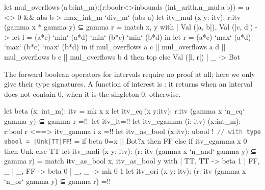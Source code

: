 \documentclass{llncs}
\begin{document}
%
\begin{fstarcode}
let mul_overflows (a b:int_m):(r:bool{r<>inbounds (int_arith.n_mul a b)})
  = a <> 0 && abs b > max_int_m `div_m` (abs a)
let itv_mul (x y: itv): r:itv {(gamma x * gamma y) ⊆ gamma r}
  = match x, y with
    | Val (|a, b|), Val (|c, d|) ->
        let l = (a*c) `min` (a*d) `min` (b*c) `min` (b*d) in
        let r = (a*c) `max` (a*d) `max` (b*c) `max` (b*d) in
        if mul_overflows a c || mul_overflows a d
        || mul_overflows b c || mul_overflows b d 
        then top else Val (|l, r|)
    | _ -> Bot
\end{fstarcode}
%
The forward boolean operators for intervals require no proof at
all; here we only give their type signatures.
%
A function of interest is : it returns
 when an interval does not contain 0,  when
it is the singleton 0,  otherwise.
%
\begin{fstarcode}
let beta (x: int_m): itv = mk x x
let itv_eq (x y:itv): r:itv {(gamma  x `n_eq` gamma  y)  ⊆  gamma  r} =!\shortdots!  let itv_lt=!\shortdots!
let itv_cgamma (i: itv) (x:int_m): r:bool {r <==> itv_gamma i x} =!\shortdots!
let itv_as_bool (x:itv): ubool !\textcolor{gray}{\texttt{ /{}/ with \textbf{type ubool = |Unk|TT|FF}}}!
  = if beta 0=x || Bot?x then FF else if itv_cgamma x 0 then Unk else TT
let itv_andi (x y: itv): (r: itv {(gamma x `n_and` gamma y) ⊆ gamma r})
  = match itv_as_bool x, itv_as_bool y with
  | TT, TT  -> beta 1 | FF, _ | _, FF -> beta 0 | _, _ -> mk 0 1
let itv_ori (x y: itv): (r: itv {(gamma x `n_or` gamma y) ⊆ gamma r}) =!\shortdots!
\end{fstarcode}
%
\end{document}
